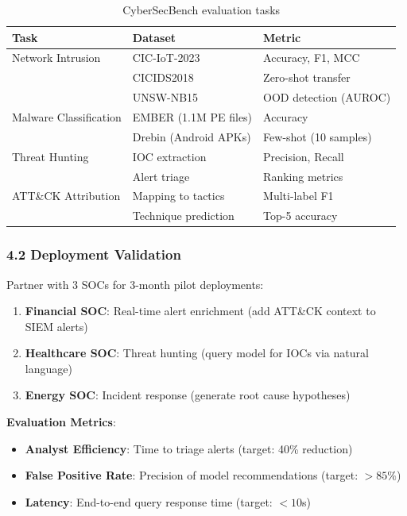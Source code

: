 \documentclass[11pt]{article}
\begin{document}
\begin{table}[h]
\centering
\small
\begin{tabular}{lll}
\toprule
\textbf{Task} & \textbf{Dataset} & \textbf{Metric} \\
\midrule
Network Intrusion & CIC-IoT-2023 & Accuracy, F1, MCC \\
& CICIDS2018 & Zero-shot transfer \\
& UNSW-NB15 & OOD detection (AUROC) \\
\midrule
Malware Classification & EMBER (1.1M PE files) & Accuracy \\
& Drebin (Android APKs) & Few-shot (10 samples) \\
\midrule
Threat Hunting & IOC extraction & Precision, Recall \\
& Alert triage & Ranking metrics \\
\midrule
ATT\&CK Attribution & Mapping to tactics & Multi-label F1 \\
& Technique prediction & Top-5 accuracy \\
\bottomrule
\end{tabular}
\caption{CyberSecBench evaluation tasks}
\end{table}

\subsubsection{4.2 Deployment Validation}

Partner with 3 SOCs for 3-month pilot deployments:

\begin{enumerate}
    \item \textbf{Financial SOC}: Real-time alert enrichment (add ATT\&CK context to SIEM alerts)
    \item \textbf{Healthcare SOC}: Threat hunting (query model for IOCs via natural language)
    \item \textbf{Energy SOC}: Incident response (generate root cause hypotheses)
\end{enumerate}

\textbf{Evaluation Metrics}:
\begin{itemize}
    \item \textbf{Analyst Efficiency}: Time to triage alerts (target: 40\% reduction)
    \item \textbf{False Positive Rate}: Precision of model recommendations (target: $> 85\%$)
    \item \textbf{Latency}: End-to-end query response time (target: $< 10$s)
\end{itemize}
\end{document}
